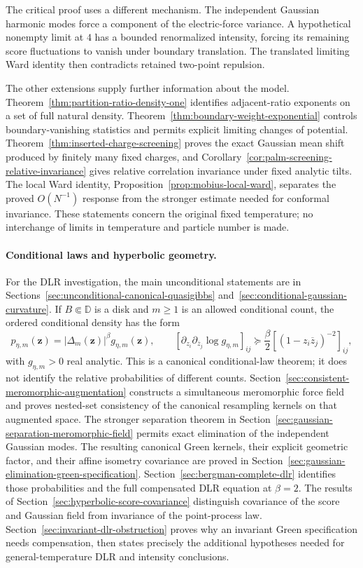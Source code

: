 \documentclass[11pt,a4paper]{article}
\numberwithin{equation}{section}
\theoremstyle{definition}
\theoremstyle{remark}
\newcommand{\D}{\mathbb D}
\begin{document}
The critical proof uses a different mechanism. The independent
Gaussian harmonic modes force a component of the electric-force
variance. A hypothetical nonempty limit at $4$ has a bounded
renormalized intensity, forcing its remaining score fluctuations
to vanish under boundary translation. The translated limiting
Ward identity then contradicts retained two-point repulsion.

The other extensions supply further information about the model.
Theorem~\ref{thm:partition-ratio-density-one} identifies adjacent-ratio
exponents on a set of full natural density.
Theorem~\ref{thm:boundary-weight-exponential} controls boundary-vanishing
statistics and permits explicit limiting changes of potential.
Theorem~\ref{thm:inserted-charge-screening} proves the exact Gaussian
mean shift produced by finitely many fixed charges, and
Corollary~\ref{cor:palm-screening-relative-invariance} gives relative
correlation invariance under fixed analytic tilts. The local Ward
identity, Proposition~\ref{prop:mobius-local-ward}, separates the
proved $O(N^{-1})$ response from the stronger estimate needed for
conformal invariance. These statements concern the original fixed
temperature; no interchange of limits in temperature and particle
number is made.



\paragraph{Conditional laws and hyperbolic geometry.}
For the DLR investigation, the main unconditional statements are in
Sections~\ref{sec:unconditional-canonical-quasigibbs}
and~\ref{sec:conditional-gaussian-curvature}. If $B\Subset\D$ is a
disk and $m\ge1$ is an allowed conditional count, the ordered
conditional density has the form
\[
 p_{\eta,m}(\mathbf z)=|\Delta_m(\mathbf z)|^\beta
                                      g_{\eta,m}(\mathbf z),
 \qquad
 \left[\partial_{z_i}\partial_{\overline z_j}\log g_{\eta,m}\right]_{ij}
 \succeq\frac\beta2\left[(1-z_i\overline z_j)^{-2}\right]_{ij},
\]
with $g_{\eta,m}>0$ real analytic. This is a canonical conditional-law
theorem; it does not identify the relative probabilities of different
counts. Section~\ref{sec:consistent-meromorphic-augmentation} constructs
a simultaneous meromorphic force field and proves nested-set
consistency of the canonical resampling kernels on that augmented space.
The stronger separation theorem in
Section~\ref{sec:gaussian-separation-meromorphic-field} permits exact
elimination of the independent Gaussian modes. The resulting canonical
Green kernels, their explicit geometric factor, and their affine
isometry covariance are proved in
Section~\ref{sec:gaussian-elimination-green-specification}.
Section~\ref{sec:bergman-complete-dlr} identifies those
probabilities and the full compensated DLR equation at $\beta=2$.
The results of Section~\ref{sec:hyperbolic-score-covariance} distinguish
covariance of the score and Gaussian field from invariance of the
point-process law. Section~\ref{sec:invariant-dlr-obstruction} proves
why an invariant Green specification needs compensation, then states
precisely the additional hypotheses needed for general-temperature
DLR and intensity conclusions.
\end{document}
